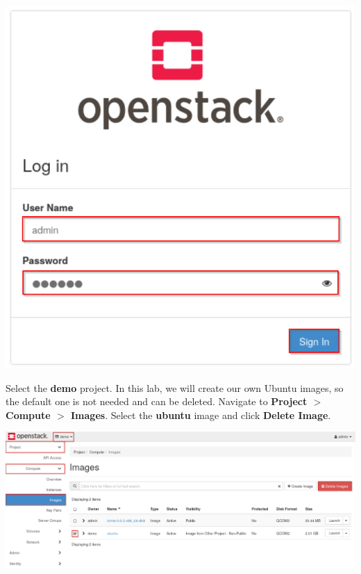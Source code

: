 \documentclass[letterpaper, 12pt]{article}
\begin{document}
\begin{enumerate}
\begin{labstep}
        \begin{center}
            \includegraphics[scale=0.5]{images/part1/step3.png}
        \end{center}
    \end{labstep}

    \begin{labstep}
        Select the \textbf{demo} project.
        In this lab, we will create our own Ubuntu images, so the default one is not needed and can be deleted.
        Navigate to \textbf{Project $>$ Compute $>$ Images}.
        Select the \textbf{ubuntu} image and click \textbf{Delete Image}.

        \begin{center}
            \includegraphics[width=\linewidth]{images/part1/step4.png}
        \end{center}
    \end{labstep}


\end{enumerate}
\end{document}
